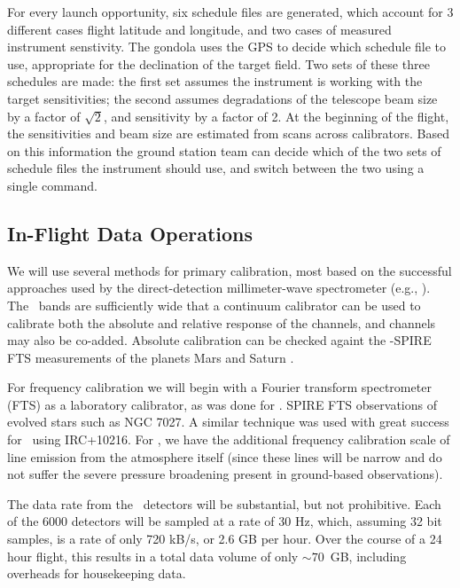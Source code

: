 For every launch opportunity, six schedule files are generated, which account for 3 different cases flight latitude and longitude, and two cases of measured instrument senstivity.
The gondola uses the GPS to decide which schedule file to use,
appropriate for the declination of the target field.  Two sets of
these three schedules are made: the first set assumes the instrument
is working with the target sensitivities; the second assumes
degradations of the telescope beam size by a factor of $\sqrt{2}$, and
sensitivity by a factor of 2.  At the beginning of the flight, the
sensitivities and beam size are estimated from scans across calibrators.  Based on this information the ground station team can decide which of the two
sets of schedule files the instrument should use, and switch between
the two using a single command.

\subsection{In-Flight Data Operations}

We will use several methods for primary calibration, most based on the
successful approaches used by the direct-detection millimeter-wave
spectrometer \zspec (e.g.,
).  The \name\ bands
are sufficiently wide that a continuum calibrator can be used to
calibrate both the absolute and relative response of the channels, and
channels may also be co-added.  Absolute calibration can be checked againt the \herschel-SPIRE FTS measurements of the 
planets Mars \citep{swinyard10mars} and Saturn \citep{fletcher12}.


For frequency calibration we will begin with a Fourier transform
spectrometer (FTS) as a laboratory calibrator, as was done for \zspec.
\herschel\-SPIRE FTS observations of evolved stars 
\citep{groenewegen11,wesson11} such as NGC 7027.
A similar technique was used with
great success for \zspec\ using IRC+10216.  For \name, we have the additional
frequency calibration scale of line emission from the atmosphere
itself (since these lines will be narrow and do not suffer the severe
pressure broadening present in ground-based observations).


The data rate from the \name\ detectors will be substantial, but not
prohibitive.  Each of the 6000 detectors will be sampled at a rate of
30 Hz, which, assuming 32 bit samples, is a rate of only 720 kB/s, or
2.6 GB per hour.  Over the course of a 24 hour flight, this results in
a total data volume of only $\sim70$~GB, including overheads for
housekeeping data.

